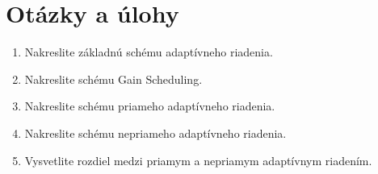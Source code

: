\documentclass[a4paper, 10pt, ]{article}
\begin{document}
\section*{Otázky a úlohy}

\begin{enumerate}
	\item Nakreslite základnú schému adaptívneho riadenia.
	\item Nakreslite schému Gain Scheduling.
	\item Nakreslite schému priameho adaptívneho riadenia.
	\item Nakreslite schému nepriameho adaptívneho riadenia.
	\item Vysvetlite rozdiel medzi priamym a nepriamym adaptívnym riadením.
\end{enumerate}
\end{document}
